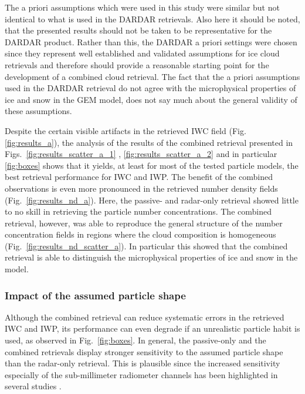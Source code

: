 \documentclass[journal abbreviation, manuscript]{copernicus}
\begin{document}
The a priori assumptions which were used in this study were similar but not
identical to what is used in the DARDAR retrievals. Also here it should be
noted, that the presented results should not be taken to be representative for
the DARDAR product. Rather than this, the DARDAR a priori settings were chosen
since they represent well established and validated assumptions for ice cloud
retrievals and therefore should provide a reasonable starting point for the
development of a combined cloud retrieval. The fact that the a priori
assumptions used in the DARDAR retrieval do not agree with the microphysical
properties of ice and snow in the GEM model, does not say much about the general
validity of these assumptions.

Despite the certain visible artifacts in the retrieved IWC field
(Fig. \ref{fig:results_a}), the analysis of the results of the combined retrieval
presented in Figs.~\ref{fig:results_scatter_a_1} , \ref{fig:results_scatter_a_2}
and in particular \ref{fig:boxes} shows that it yields, at least for most of the
tested particle models, the best retrieval performance for IWC and IWP. The
benefit of the combined observations is even more pronounced in the retrieved
number density fields (Fig.~\ref{fig:results_nd_a}). Here, the passive- and
radar-only retrieval showed little to no skill in retrieving the particle number
concentrations. The combined retrieval, however, was able to reproduce the
general structure of the number concentration fields in regions where the cloud
composition is homogeneous (Fig.~\ref{fig:results_nd_scatter_a}). In particular
this showed that the combined retrieval is able to distinguish the microphysical
properties of ice and snow in the model.

\subsubsection{Impact of the assumed particle shape}

Although the combined retrieval can reduce systematic errors in the retrieved
IWC and IWP, its performance can even degrade if an unrealistic particle habit
is used, as observed in Fig.~\ref{fig:boxes}. In general, the passive-only and
the combined retrievals display stronger sensitivity to the assumed particle shape
than the radar-only retrieval. This is plausible since the increased sensitivity
especially of the sub-millimeter radiometer channels has been highlighted
in several studies \citep{ekelund19a, fox19}.
\end{document}
